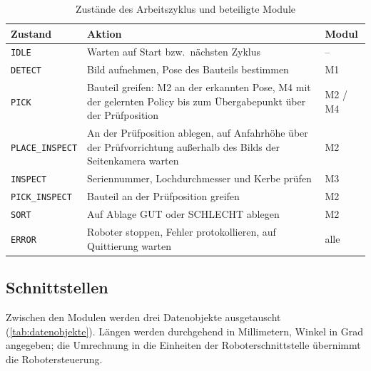 \begin{table}[htbp]
  \centering
  \caption{Zustände des Arbeitszyklus und beteiligte Module}
  \label{tab:zustaende}
  \begin{tabularx}{\textwidth}{@{}l X l@{}}
    \toprule
    Zustand & Aktion & Modul \\
    \midrule
    \texttt{IDLE}          & Warten auf Start bzw.\ nächsten Zyklus & -- \\
    \texttt{DETECT}        & Bild aufnehmen, Pose des Bauteils bestimmen & M1 \\
    \texttt{PICK}          & Bauteil greifen: M2 an der erkannten Pose, M4 mit der gelernten
                             Policy bis zum Übergabepunkt über der Prüfposition & M2 / M4 \\
    \texttt{PLACE\_INSPECT} & An der Prüfposition ablegen, auf Anfahrhöhe über der
                             Prüfvorrichtung außerhalb des Bilds der Seitenkamera warten & M2 \\
    \texttt{INSPECT}       & Seriennummer, Lochdurchmesser und Kerbe prüfen & M3 \\
    \texttt{PICK\_INSPECT}  & Bauteil an der Prüfposition greifen & M2 \\
    \texttt{SORT}          & Auf Ablage GUT oder SCHLECHT ablegen & M2 \\
    \texttt{ERROR}         & Roboter stoppen, Fehler protokollieren, auf Quittierung warten & alle \\
    \bottomrule
  \end{tabularx}
\end{table}

\subsection{Schnittstellen}
\label{sec:schnittstellen}

Zwischen den Modulen werden drei Datenobjekte ausgetauscht (\cref{tab:datenobjekte}).
Längen werden durchgehend in Millimetern, Winkel in Grad angegeben; die Umrechnung in die
Einheiten der Roboterschnittstelle übernimmt die Robotersteuerung.

